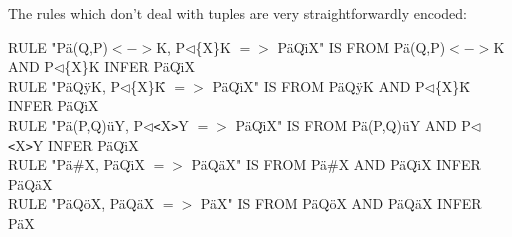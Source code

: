 %
%
%
%
%
%


The rules which don't deal with tuples are very straightforwardly encoded:

RULE "P\"{a}(Q,P)$<->$K, P$\triangleleft$\{X\}K $=>$ P\"{a}Q\"{\i}X" IS FROM P\"{a}(Q,P)$<->$K AND P$\triangleleft$\{X\}K INFER P\"{a}Q\"{\i}X\\
RULE "P\"{a}Q\"{y}K, P$\triangleleft$\{X\}K\={} $=>$ P\"{a}Q\"{\i}X" IS FROM P\"{a}Q\"{y}K AND P$\triangleleft$\{X\}K\={} INFER P\"{a}Q\"{\i}X\\
RULE "P\"{a}(P,Q)\"{u}Y, P$\triangleleft$\texttt{<}X\texttt{>}Y $=>$ P\"{a}Q\"{\i}X" IS FROM P\"{a}(P,Q)\"{u}Y AND P$\triangleleft$\texttt{<}X\texttt{>}Y INFER P\"{a}Q\"{\i}X\\
RULE "P\"{a}\#X, P\"{a}Q\"{\i}X $=>$ P\"{a}Q\"{a}X" IS FROM P\"{a}\#X AND P\"{a}Q\"{\i}X INFER P\"{a}Q\"{a}X\\
RULE "P\"{a}Q\"{o}X, P\"{a}Q\"{a}X $=>$ P\"{a}X" IS FROM P\"{a}Q\"{o}X AND P\"{a}Q\"{a}X INFER P\"{a}X

